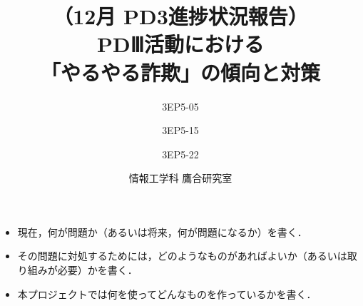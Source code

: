 


% 
%
\MyLogo{}

% 
%


\cfoot{\thepage/\pageref{LastPage}}

% 
%

\title{
{\large （12月 PD3進捗状況報告）}\\\vspace{10mm}
{\LARGE PDⅢ活動における\\「やるやる詐欺」の傾向と対策}
}
\date{情報工学科 鷹合研究室}
\author{
3EP5-05\\  \and
3EP5-15\\  \and 
3EP5-22\\ 
}




\maketitle %

\begin{itemize}
 \item 現在，何が問題か（あるいは将来，何が問題になるか）を書く．
 \item その問題に対処するためには，どのようなものがあればよいか（あるいは取り組みが必要）かを書く．
 \item 本プロジェクトでは何を使ってどんなものを作っているかを書く．
\end{itemize}
\newpage

